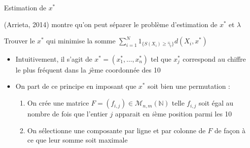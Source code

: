 \documentclass[10pt,xcolor=table,color={dvipsnames,usenames},ignorenonframetext,usepdftitle=false,french]{beamer}
\begin{document}
\begin{frame}{Estimation de \(x^*\)}
\protect\hypertarget{estimation-de-x}{}

\bcloupe (Arrieta, 2014) montre qu'on peut séparer le problème
d'estimation de \(x^*\) et \(\lambda\)

\pause

Trouver le \(x^*\) qui minimise la somme
\(\sum_{i=1}^N 1_{\{S(X_{i})\geq\hat{\gamma}_{t}\}}d(X_i,x^*)\)

\begin{itemize}

\pause 

\item Intuitivement, il s'agit de $x^*=(x_1^*,\dots,x_n^*)$ tel que $x_j^*$ correspond au chiffre le plus fréquent dans la $j$ème coordonnée des 10 %

\pause 

\item On part de ce principe en imposant que $x^*$ soit bien une permutation :

\begin{enumerate}
\item On crée une matrice $F=(f_{i,j})\in\mathcal M_{n,m}(\mathbb{N})$ telle $f_{i,j}$ soit égal au nombre de fois que l'entier $j$ apparait en $i$ème position parmi les 10 %

\item On sélectionne une composante par ligne et par colonne de $F$ de façon à ce que leur somme soit maximale
\end{enumerate}
\end{itemize}

\end{frame}
\end{document}
